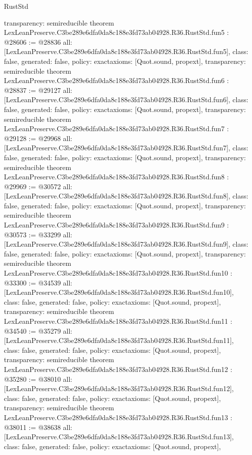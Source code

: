 \begin{lexlean}{RustStd}
\begin{coremodule}
{  transparency: semireducible
}
theorem LexLeanPreserve.C3be289e6dfa0da8c188e3fd73ab04928.R36.RustStd.fun5 : @28606 := @28836 {
  all: [LexLeanPreserve.C3be289e6dfa0da8c188e3fd73ab04928.R36.RustStd.fun5],
  class: false,
  generated: false,
  policy: exact{axioms: [Quot.sound, propext]},
  transparency: semireducible
}
theorem LexLeanPreserve.C3be289e6dfa0da8c188e3fd73ab04928.R36.RustStd.fun6 : @28837 := @29127 {
  all: [LexLeanPreserve.C3be289e6dfa0da8c188e3fd73ab04928.R36.RustStd.fun6],
  class: false,
  generated: false,
  policy: exact{axioms: [Quot.sound, propext]},
  transparency: semireducible
}
theorem LexLeanPreserve.C3be289e6dfa0da8c188e3fd73ab04928.R36.RustStd.fun7 : @29128 := @29968 {
  all: [LexLeanPreserve.C3be289e6dfa0da8c188e3fd73ab04928.R36.RustStd.fun7],
  class: false,
  generated: false,
  policy: exact{axioms: [Quot.sound, propext]},
  transparency: semireducible
}
theorem LexLeanPreserve.C3be289e6dfa0da8c188e3fd73ab04928.R36.RustStd.fun8 : @29969 := @30572 {
  all: [LexLeanPreserve.C3be289e6dfa0da8c188e3fd73ab04928.R36.RustStd.fun8],
  class: false,
  generated: false,
  policy: exact{axioms: [Quot.sound, propext]},
  transparency: semireducible
}
theorem LexLeanPreserve.C3be289e6dfa0da8c188e3fd73ab04928.R36.RustStd.fun9 : @30573 := @33299 {
  all: [LexLeanPreserve.C3be289e6dfa0da8c188e3fd73ab04928.R36.RustStd.fun9],
  class: false,
  generated: false,
  policy: exact{axioms: [Quot.sound, propext]},
  transparency: semireducible
}
theorem LexLeanPreserve.C3be289e6dfa0da8c188e3fd73ab04928.R36.RustStd.fun10 : @33300 := @34539 {
  all: [LexLeanPreserve.C3be289e6dfa0da8c188e3fd73ab04928.R36.RustStd.fun10],
  class: false,
  generated: false,
  policy: exact{axioms: [Quot.sound, propext]},
  transparency: semireducible
}
theorem LexLeanPreserve.C3be289e6dfa0da8c188e3fd73ab04928.R36.RustStd.fun11 : @34540 := @35279 {
  all: [LexLeanPreserve.C3be289e6dfa0da8c188e3fd73ab04928.R36.RustStd.fun11],
  class: false,
  generated: false,
  policy: exact{axioms: [Quot.sound, propext]},
  transparency: semireducible
}
theorem LexLeanPreserve.C3be289e6dfa0da8c188e3fd73ab04928.R36.RustStd.fun12 : @35280 := @38010 {
  all: [LexLeanPreserve.C3be289e6dfa0da8c188e3fd73ab04928.R36.RustStd.fun12],
  class: false,
  generated: false,
  policy: exact{axioms: [Quot.sound, propext]},
  transparency: semireducible
}
theorem LexLeanPreserve.C3be289e6dfa0da8c188e3fd73ab04928.R36.RustStd.fun13 : @38011 := @38638 {
  all: [LexLeanPreserve.C3be289e6dfa0da8c188e3fd73ab04928.R36.RustStd.fun13],
  class: false,
  generated: false,
  policy: exact{axioms: [Quot.sound, propext]},
}
\end{coremodule}
\end{lexlean}
